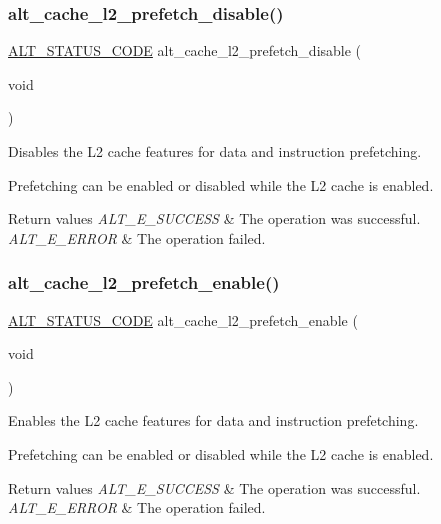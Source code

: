 \subsubsection{\texorpdfstring{alt\_cache\_l2\_prefetch\_disable()}{alt\_cache\_l2\_prefetch\_disable()}}
{\footnotesize\ttfamily \mbox{\hyperlink{hwlib_8h_abdb0d369f069723ca55d6c94bcaaaa12}{A\+L\+T\+\_\+\+S\+T\+A\+T\+U\+S\+\_\+\+C\+O\+DE}} alt\+\_\+cache\+\_\+l2\+\_\+prefetch\+\_\+disable (\begin{DoxyParamCaption}\item[{void}]{ }\end{DoxyParamCaption})}

Disables the L2 cache features for data and instruction prefetching.

Prefetching can be enabled or disabled while the L2 cache is enabled.


\begin{DoxyRetVals}{Return values}
{\em A\+L\+T\+\_\+\+E\+\_\+\+S\+U\+C\+C\+E\+SS} & The operation was successful. \\
\hline
{\em A\+L\+T\+\_\+\+E\+\_\+\+E\+R\+R\+OR} & The operation failed. \\
\hline
\end{DoxyRetVals}
\mbox{\label{group__CACHE__L2_ga1dbb9c8fc8a119abd49ee9ed49f774bf}} 
\subsubsection{\texorpdfstring{alt\_cache\_l2\_prefetch\_enable()}{alt\_cache\_l2\_prefetch\_enable()}}
{\footnotesize\ttfamily \mbox{\hyperlink{hwlib_8h_abdb0d369f069723ca55d6c94bcaaaa12}{A\+L\+T\+\_\+\+S\+T\+A\+T\+U\+S\+\_\+\+C\+O\+DE}} alt\+\_\+cache\+\_\+l2\+\_\+prefetch\+\_\+enable (\begin{DoxyParamCaption}\item[{void}]{ }\end{DoxyParamCaption})}

Enables the L2 cache features for data and instruction prefetching.

Prefetching can be enabled or disabled while the L2 cache is enabled.


\begin{DoxyRetVals}{Return values}
{\em A\+L\+T\+\_\+\+E\+\_\+\+S\+U\+C\+C\+E\+SS} & The operation was successful. \\
\hline
{\em A\+L\+T\+\_\+\+E\+\_\+\+E\+R\+R\+OR} & The operation failed. \\
\hline
\end{DoxyRetVals}
\mbox{\label{group__CACHE__L2_ga427443378a01449d77425d5987f3b0f6}} 
